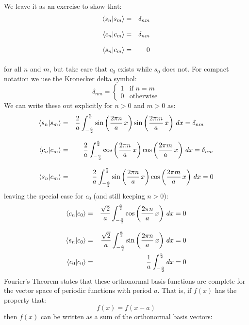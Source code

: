 \documentclass[12pt]{book}
\begin{document}
We leave it as an exercise to show that:
\begin{eqnarray}
\braket{s_n | s_m} &=& \delta_{nm}\notag\\[8pt]
\braket{c_n | c_m} &=& \delta_{nm}\notag\\[8pt]
\braket{s_n | c_m} &=& 0\notag\\[8pt]
\end{eqnarray}
for all $n$ and $m$, but take care that $c_0$ exists while $s_0$ does not.  
For compact notation we use the Kronecker delta symbol:
\begin{displaymath}
\delta_{nm} =  
\left\{
	\begin{array}{ll}
		1  & \mbox{if } n=m \\
		0 & \mbox{otherwise}
	\end{array}
\right.
\end{displaymath}
We can write these out explicitly for $n>0$ and $m>0$ as:
\begin{eqnarray}
\braket{s_n|s_m} &=& \frac{2}{a} \int_{-\frac{a}{2}}^{\frac{a}{2}} 
\sin\left(\frac{2\pi n}{a} \, x \right) \sin\left(\frac{2\pi m}{a} \, x \right) \, dx = \delta_{nm} \;\;\;\;\; \notag\\[8pt]
\braket{c_n| c_m} &=& \frac{2}{a} \int_{-\frac{a}{2}}^{\frac{a}{2}} 
\cos\left(\frac{2\pi n}{a} \, x \right) \cos\left(\frac{2\pi m}{a} \, x \right) \, dx = \delta_{nm}\notag\\[8pt]
\braket{s_n| c_m} &=& \frac{2}{a} \int_{-\frac{a}{2}}^{\frac{a}{2}} 
\sin\left(\frac{2\pi n}{a} \, x \right) \cos\left(\frac{2\pi m}{a} \, x \right) \, dx = 0 \notag\\
\end{eqnarray}
leaving the special case for $c_0$ (and still keeping $n>0$):
\begin{eqnarray}
\braket{c_n| c_0} &=& \frac{\sqrt{2}}{a} \int_{-\frac{a}{2}}^{\frac{a}{2}} 
\cos\left(\frac{2\pi n}{a} \, x \right) \, dx = 0 \notag\\[8pt]
\braket{s_n| c_0} &=& \frac{\sqrt{2}}{a} \int_{-\frac{a}{2}}^{\frac{a}{2}} 
\sin\left(\frac{2\pi n}{a} \, x \right) \, dx = 0 \notag\\
\braket{c_0| c_0} &=& \frac{1}{a} \int_{-\frac{a}{2}}^{\frac{a}{2}} dx = 0 \notag\\
\end{eqnarray}
Fourier's Theorem states that these orthonormal basis functions are complete for the vector space of periodic functions with period $a$.  That is, if $f(x)$ has the property that:
$$f(x) = f(x+a)$$
then $f(x)$ can be written as a sum of the orthonormal basis vectors:
\end{document}
